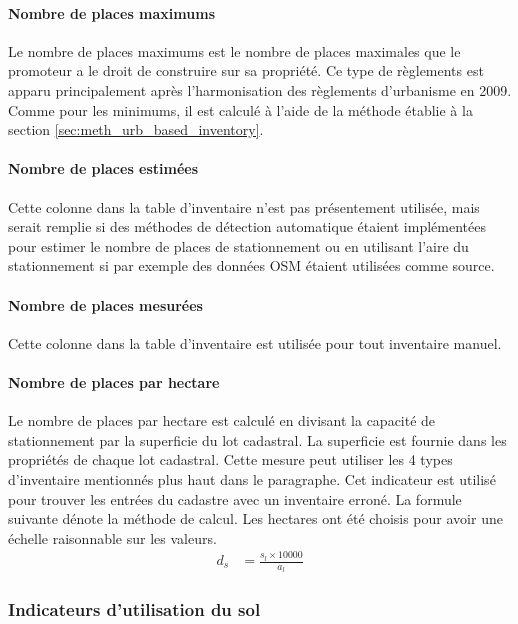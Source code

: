             \paragraph{Nombre de places maximums} Le nombre de places maximums est le nombre de places maximales que le promoteur a le droit de construire sur sa propriété. Ce type de règlements est apparu principalement après l'harmonisation des règlements d'urbanisme en 2009. Comme pour les minimums, il est calculé à l'aide de la méthode établie à la section \ref{sec:meth_urb_based_inventory}.
            
            \paragraph{Nombre de places estimées} Cette colonne dans la table d'inventaire n'est pas présentement utilisée, mais serait remplie si des méthodes de détection automatique étaient implémentées pour estimer le nombre de places de stationnement ou en utilisant l'aire du stationnement si par exemple des données \ac{OSM} étaient utilisées comme source.
            
            \paragraph{Nombre de places mesurées} Cette colonne dans la table d'inventaire est utilisée pour tout inventaire manuel.  
            
            \paragraph{Nombre de places par hectare} Le nombre de places par hectare est calculé en divisant la capacité de stationnement par la superficie du lot cadastral. La superficie est fournie dans les propriétés de chaque lot cadastral. Cette mesure peut utiliser les 4 types d'inventaire mentionnés plus haut dans le paragraphe. Cet indicateur est utilisé pour trouver les entrées du cadastre avec un inventaire erroné. La formule suivante dénote la méthode de calcul. Les hectares ont été choisis pour avoir une échelle raisonnable sur les valeurs.
            \begin{align}
                d_s &= \frac{s_l \times 10000}{a_l} 
            \end{align}
        \subsubsection{Indicateurs d'utilisation du sol}
